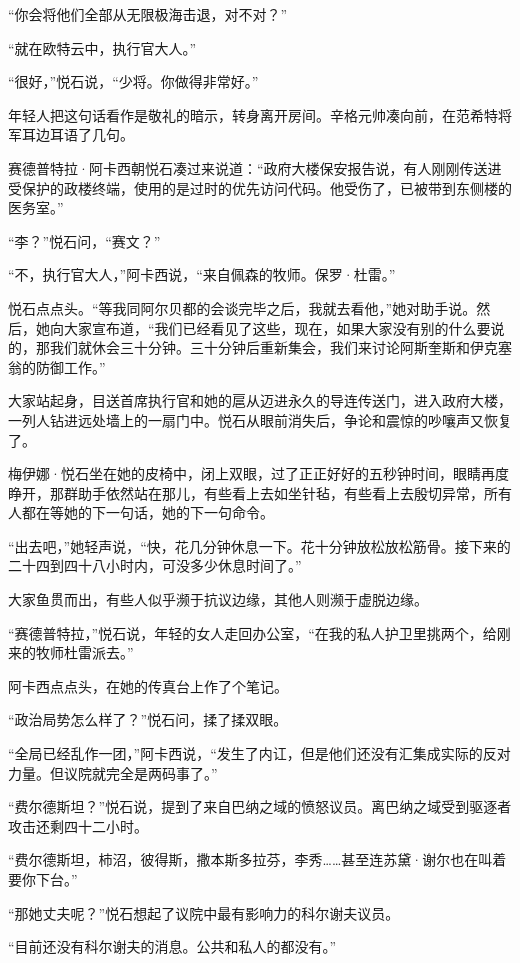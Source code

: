 \documentclass[AutoFakeBold=true]{book}
\begin{document}
``你会将他们全部从无限极海击退，对不对？''

``就在欧特云中，执行官大人。''

``很好，''悦石说，``少将。你做得非常好。''

年轻人把这句话看作是敬礼的暗示，转身离开房间。辛格元帅凑向前，在范希特将军耳边耳语了几句。

赛德普特拉·阿卡西朝悦石凑过来说道：``政府大楼保安报告说，有人刚刚传送进受保护的政楼终端，使用的是过时的优先访问代码。他受伤了，已被带到东侧楼的医务室。''

``李？''悦石问，``赛文？''

``不，执行官大人，''阿卡西说，``来自佩森的牧师。保罗·杜雷。''

悦石点点头。``等我同阿尔贝都的会谈完毕之后，我就去看他，''她对助手说。然后，她向大家宣布道，``我们已经看见了这些，现在，如果大家没有别的什么要说的，那我们就休会三十分钟。三十分钟后重新集会，我们来讨论阿斯奎斯和伊克塞翁的防御工作。''

大家站起身，目送首席执行官和她的扈从迈进永久的导连传送门，进入政府大楼，一列人钻进远处墙上的一扇门中。悦石从眼前消失后，争论和震惊的吵嚷声又恢复了。

\vspace*{1em}

梅伊娜·悦石坐在她的皮椅中，闭上双眼，过了正正好好的五秒钟时间，眼睛再度睁开，那群助手依然站在那儿，有些看上去如坐针毡，有些看上去殷切异常，所有人都在等她的下一句话，她的下一句命令。

``出去吧，''她轻声说，``快，花几分钟休息一下。花十分钟放松放松筋骨。接下来的二十四到四十八小时内，可没多少休息时间了。''

大家鱼贯而出，有些人似乎濒于抗议边缘，其他人则濒于虚脱边缘。

``赛德普特拉，''悦石说，年轻的女人走回办公室，``在我的私人护卫里挑两个，给刚来的牧师杜雷派去。''

阿卡西点点头，在她的传真台上作了个笔记。

``政治局势怎么样了？''悦石问，揉了揉双眼。

``全局已经乱作一团，''阿卡西说，``发生了内讧，但是他们还没有汇集成实际的反对力量。但议院就完全是两码事了。''

``费尔德斯坦？''悦石说，提到了来自巴纳之域的愤怒议员。离巴纳之域受到驱逐者攻击还剩四十二小时。

``费尔德斯坦，柿沼，彼得斯，撒本斯多拉芬，李秀……甚至连苏黛·谢尔也在叫着要你下台。''

``那她丈夫呢？''悦石想起了议院中最有影响力的科尔谢夫议员。

``目前还没有科尔谢夫的消息。公共和私人的都没有。''
\end{document}
